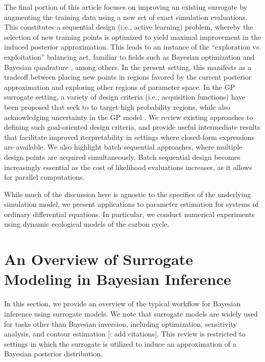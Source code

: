 \documentclass[12pt]{article}
\begin{document}
The final portion of this article focuses on improving an existing surrogate by augmenting the training data 
using a new set of exact simulation evaluations. This constitutes a sequential design (i.e., active learning) problem, 
whereby the selection of new training points is optimized to yield maximal improvement in the induced 
posterior approximation. This leads to an instance of the ``exploration vs. exploitation'' balancing act,
familiar to fields such as Bayesian optimization \citep{reviewBayesOpt} and Bayesian quadrature 
\citep{BayesQuadrature,BayesQuadratureAL,BayesQuadRatios}, among others. In the present setting, this 
manifests as a tradeoff between placing new points in regions favored by the current posterior approximation
and exploring other regions of parameter space. In the GP surrogate setting, a variety of 
design criteria (i.e., acquisition functions) have been proposed that seek to to target high probability regions, 
while also acknowledging uncertainty in the GP model 
\citep{SinsbeckNowak,Surer2023sequential,KandasamyActiveLearning2015,weightedIVAR,VehtariParallelGP,VillaniAdaptiveGP}.
We review existing approaches to defining such goal-oriented design criteria, and provide useful intermediate results that 
facilitate improved iterpretability in settings where closed-form expressions are available.
We also highlight batch sequential approaches, where multiple design points are acquired simultaneously. 
Batch sequential design becomes increasingly essential as the cost of likelihood evaluations increases, as it allows for 
parallel computations. 

While much of the discussion here is agnostic to the specifics of the underlying simulation model, we present applications 
to parameter estimation for systems of ordinary differential equations. In particular, we conduct numerical experiments 
using dynamic ecological models of the carbon cycle.













\section{An Overview of Surrogate Modeling in Bayesian Inference}
In this section, we provide an overview of the typical workflow for Bayesian inference using surrogate models. We note 
that surrogate models are widely used for tasks other than Bayesian inversion, including optimization, sensitivity analysis, 
and contour estimation [\todo: add citations]. This review is restricted to settings in which the surrogate is utilized to induce
an approximation of a Bayesian posterior distribution. 
\end{document}
